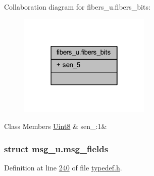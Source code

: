 Collaboration diagram for fibers\+\_\+u.\+fibers\+\_\+bits\+:
\nopagebreak
\begin{figure}[H]
\begin{center}
\leavevmode
\includegraphics[width=178pt]{d7/d2f/a00258}
\end{center}
\end{figure}
\begin{DoxyFields}{Class Members}
\hypertarget{a00001_a445025338213b6ccd159dcd7d72e63cc}{\hyperlink{a00001_a979e3e23b9a449e69ab6a8a83b6042f8}{Uint8}}\label{a00001_a445025338213b6ccd159dcd7d72e63cc}
&
sen\+\_\+:1&
\\
\hline

\end{DoxyFields}
\label{d1/d1e/a00087}
\hypertarget{a00001_d1/d1e/a00087}{}
\subsubsection{struct msg\+\_\+u.\+msg\+\_\+fields}


Definition at line \hyperlink{a00001_source_l00240}{240} of file \hyperlink{a00001_source}{typedef.\+h}.



